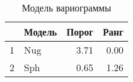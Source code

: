 \begin{table}[H]
\centering
\begin{tabular}{rlrr}
  \hline
 & Модель & Порог & Ранг \\ 
  \hline
1 & Nug & 3.71 & 0.00 \\ 
  2 & Sph & 0.65 & 1.26 \\ 
   \hline
\end{tabular}
\caption{Модель вариограммы} 
\label{table:manual_model}
\end{table}
